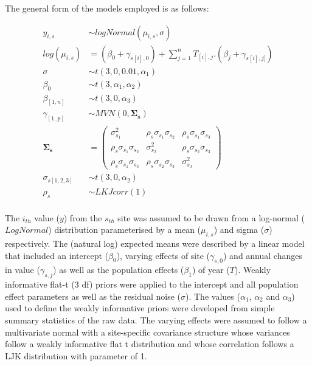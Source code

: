 \documentclass[
  8pt,
  a4paper]{article}
\begin{document}
The general form of the models employed is as follows:

\[
\begin{aligned}
y_{i,s} &\sim{} \mathit{logNormal}(\mu_{i,s}, \sigma)\\
log(\mu_{i,s}) &= (\beta_0 + \gamma_{s[i],0}) + \sum_{j=1}^nT_{[i],j}.(\beta_j + \gamma_{s[i],j]})\\
\sigma&\sim\mathit{t}(3, 0, 0.01, \alpha_1)\\
\beta_0&\sim{}\mathit{t}(3, \alpha_1, \alpha_2)\\
\beta_{[1,n]}&\sim{}\mathit{t}(3, 0, \alpha_3)\\
\gamma_{[1..p]}&\sim{}MVN(0, \boldsymbol{\Sigma_s})\\
\boldsymbol{\Sigma_s} &=
{\begin{pmatrix}
\sigma_{s_1}^2 & \rho_s \sigma_{s_1} \sigma_{s_2} & \rho_s \sigma_{s_1} \sigma_{s_3}\\
\rho_s \sigma_{s_1} \sigma_{s_2} & \sigma_{s_2}^2 & \rho_s \sigma_{s_2} \sigma_{s_3}\\
\rho_s \sigma_{s_1} \sigma_{s_3}  & \rho_s \sigma_{s_2} \sigma_{s_3} & \sigma_{s_3}^2
\end{pmatrix}}\\
\sigma_{s[1,2,3]} &\sim \mathit{t}(3, 0, \alpha_2)\\
\rho_s &\sim \mathit{LKJcorr}(1)\\
\end{aligned}
\]

The \(i_{th}\) value (\(y\)) from the \(s_{th}\) site was assumed to be
drawn from a log-normal (\(\mathit{LogNormal}\)) distribution
parameterised by a mean (\(\mu_{i,s}\)) and sigma (\(\sigma\))
respectively. The (natural log) expected means were described by a
linear model that included an intercept (\(\beta_0\)), varying effects
of site (\(\gamma_{s,0}\)) and annual changes in value
(\(\gamma_{s,j}\)) as well as the population effects (\(\beta_1\)) of
year (\(T\)). Weakly informative flat-t (3 df) priors were applied to
the intercept and all population effect parameters as well as the
residual noise (\(\sigma\)). The values (\(\alpha_1\), \(\alpha_2\) and
\(\alpha_3\)) used to define the weakly informative priors were
developed from simple summary statistics of the raw data. The varying
effects were assumed to follow a multivariate normal with a
site-specific covariance structure whose variances follow a weakly
informative flat t distribution and whose correlation follows a LJK
distribution with parameter of 1.
\end{document}

